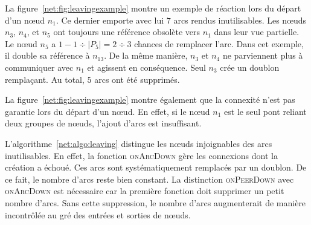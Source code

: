 \begin{figure*}
  \centering
  \hspace{40pt}
  \hspace{40pt}
  \caption[Gestion des départs et des défaillances dans
  \SPRAY]{\label{net:fig:leavingexample}Exemple de gestion des départs et des
    défaillances dans \SPRAY.}
\end{figure*}

La figure~\ref{net:fig:leavingexample} montre un exemple de réaction lors du
départ d'un nœud $n_1$. Ce dernier emporte avec lui $7$ arcs rendus
inutilisables. Les nœuds $n_3$, $n_4$, et $n_5$ ont toujours une référence
obsolète vers $n_1$ dans leur vue partielle. Le nœud $n_5$ a
$1-{1\div{|P_5|}}={2\div{3}}$ chances de remplacer l'arc. Dans cet
exemple, il double sa référence à $n_{13}$. De la même manière, $n_3$ et $n_4$
ne parviennent plus à communiquer avec $n_1$ et agissent en conséquence. Seul
$n_3$ crée un doublon remplaçant. Au total, $5$ arcs ont été supprimés.

\noindent La figure~\ref{net:fig:leavingexample} montre également que la
connexité n'est pas garantie lors du départ d'un
nœud.
En effet, si le nœud $n_1$ est le seul pont reliant deux groupes de nœuds,
l'ajout d'arcs est insuffisant.

L'algorithme~\ref{net:algo:leaving} distingue les nœuds injoignables des arcs
inutilisables. En effet, la fonction \textsc{onArcDown} gère les connexions dont
la création a échoué. Ces arcs sont systématiquement remplacés par un
doublon. De ce fait, le nombre d'arcs reste bien constant. La distinction
\textsc{onPeerDown} avec \textsc{onArcDown} est nécessaire car la première
fonction doit supprimer un petit nombre d'arcs. Sans cette suppression, le
nombre d'arcs augmenterait de manière incontrôlée au gré des entrées et sorties
de nœuds.

